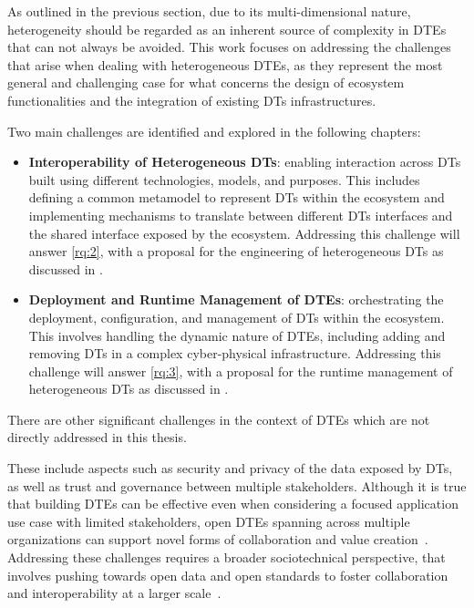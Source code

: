 As outlined in the previous section, due to its multi-dimensional nature, heterogeneity should be regarded as an inherent source of complexity in \acp{DTE} that can not always be avoided.
%
This work focuses on addressing the challenges that arise when dealing with heterogeneous \acp{DTE}, as they represent the most general and challenging case for what concerns the design of ecosystem functionalities and the integration of existing \acp{DT} infrastructures.

Two main challenges are identified and explored in the following chapters:

\begin{itemize}
    \item \textbf{Interoperability of Heterogeneous \aclp{DT}}: enabling interaction across \acp{DT} built using different technologies, models, and purposes. This includes defining a common metamodel to represent \acp{DT} within the ecosystem and implementing mechanisms to translate between different \acp{DT} interfaces and the shared interface exposed by the ecosystem.
    Addressing this challenge will answer \ref{rq:2}, with a proposal for the engineering of heterogeneous \acp{DT} as discussed in .

    \item \textbf{Deployment and Runtime Management of \aclp{DTE}}: orchestrating the deployment, configuration, and management of \acp{DT} within the ecosystem. This involves handling the dynamic nature of \acp{DTE}, including adding and removing \acp{DT} in a complex cyber-physical infrastructure. Addressing this challenge will answer \ref{rq:3}, with a proposal for the runtime management of heterogeneous \acp{DT} as discussed in .
\end{itemize}

There are other significant challenges in the context of \acp{DTE} which are not directly addressed in this thesis.

These include aspects such as security and privacy of the data exposed by \acp{DT}, as well as trust and governance between multiple stakeholders.
%
Although it is true that building \acp{DTE} can be effective even when considering a focused application use case with limited stakeholders, open \acp{DTE} spanning across multiple organizations can support novel forms of collaboration and value creation~\cite{kendall2021ndt}.
%
Addressing these challenges requires a broader sociotechnical perspective, that involves pushing towards open data and open standards to foster collaboration and interoperability at a larger scale~\cite{Acharya_Khan_Päivärinta_2024}.

